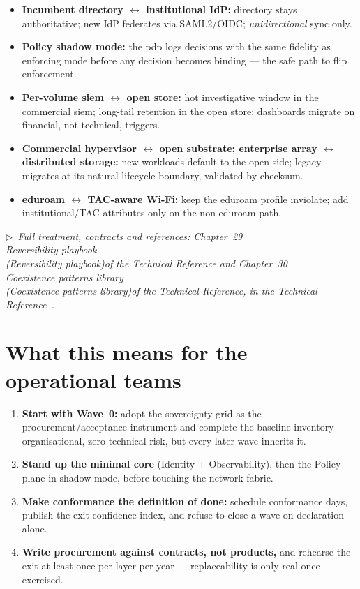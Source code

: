 \documentclass[11pt,a4paper]{article}
\newcommand{\trchap}[2]{%
  Chapter~#1%
  \ifx\\#2\\\else\space(\emph{#2})\fi\space of the Technical Reference}
\newcommand{\mainref}[1]{%
  \par\vspace{1pt}
  {\footnotesize\color{gray}\itshape
  $\triangleright$~Full treatment, contracts and references: #1,
  in the Technical Reference~\cite{ng-tech-ref-2026}.}\par\vspace{2pt}}
\begin{document}
\begin{principlebox}
\begin{itemize}[nosep,leftmargin=1.2em]
  \item \textbf{Incumbent directory $\leftrightarrow$ institutional IdP:}
    directory stays authoritative; new IdP federates via SAML2/OIDC;
    \emph{unidirectional} sync only.
  \item \textbf{Policy shadow mode:} the \gls{pdp} logs decisions with the
    same fidelity as enforcing mode before any decision becomes binding ---
    the safe path to flip enforcement.
  \item \textbf{Per-volume \gls{siem} $\leftrightarrow$ open store:} hot
    investigative window in the commercial \gls{siem}; long-tail retention in
    the open store; dashboards migrate on financial, not technical, triggers.
  \item \textbf{Commercial hypervisor $\leftrightarrow$ open substrate;
    enterprise array $\leftrightarrow$ distributed storage:} new workloads
    default to the open side; legacy migrates at its natural lifecycle
    boundary, validated by checksum.
  \item \textbf{eduroam $\leftrightarrow$ TAC-aware Wi-Fi:} keep the eduroam
    profile inviolate; add institutional/TAC attributes only on the
    non-eduroam path.
\end{itemize}
\end{principlebox}

\mainref{\trchap{29}{Reversibility playbook} and
\trchap{30}{Coexistence patterns library}}

\section{What this means for the operational teams}

\begin{actionbox}
\begin{enumerate}[leftmargin=1.5em]
  \item \textbf{Start with Wave~0:} adopt the sovereignty grid as the
    procurement/acceptance instrument and complete the baseline inventory ---
    organisational, zero technical risk, but every later wave inherits it.
  \item \textbf{Stand up the minimal core} (Identity + Observability), then
    the Policy plane in shadow mode, before touching the network fabric.
  \item \textbf{Make conformance the definition of done:} schedule
    conformance days, publish the exit-confidence index, and refuse to close
    a wave on declaration alone.
  \item \textbf{Write procurement against contracts, not products,} and
    rehearse the exit at least once per layer per year --- replaceability is
    only real once exercised.
\end{enumerate}
\end{actionbox}
\end{document}
